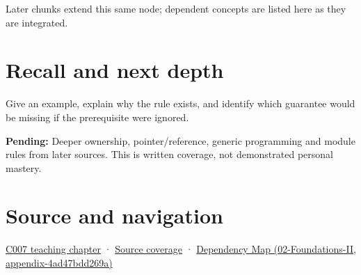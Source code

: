 Later chunks extend this same node; dependent concepts are listed here as they are integrated.

\section{Recall and next depth}\label{appendix-806686359e1b-recall-and-next-depth}

Give an example, explain why the rule exists, and identify which guarantee would be missing if the prerequisite were ignored.

\textbf{Pending:} Deeper ownership, pointer/reference, generic programming and module rules from later sources. This is written coverage, not demonstrated personal mastery.

\section{Source and navigation}\label{appendix-806686359e1b-source-and-navigation}

\href{Continuous\%20Notes/Computing\%20Foundations\%20-\%20From\%20Bits\%20to\%20C++\%20and\%20Systems\%20APIs\#Giving\%20a\%20program\%20a\%20buildable\%20shape}{C007 teaching chapter} · \hyperref[appendix-fd090d982a15-m007---parts-101-112]{Source coverage} · \href{../02-Foundations-II/main.pdf\#nameddest=appendix-4ad47bdd269a}{Dependency Map (02-Foundations-II, appendix-4ad47bdd269a)}

